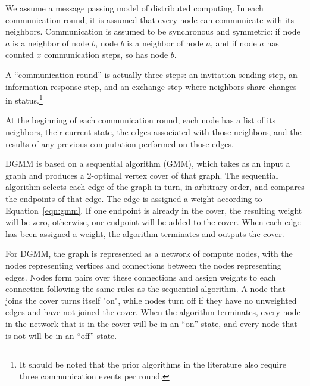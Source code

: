\begin{note}
\label{not:com-model}
We assume a message passing model of distributed computing. In each communication round, it is assumed that every node can communicate with its neighbors. Communication is assumed to be synchronous and symmetric: if node $a$ is a neighbor of node $b$, node $b$ is a neighbor of node $a$, and if node $a$ has counted $x$ communication steps, so has node $b$.

A ``communication round'' is actually three steps: an invitation sending step, an information response step, and an exchange step where neighbors share changes in status.\footnote{It should be noted that the prior algorithms in the literature also require three communication events per round.} 
\end{note}
\begin{note}
\label{not:dgmm-local-info}
At the beginning of each communication round, each node has a list of its neighbors, their current state, the edges associated with those neighbors, and the results of any previous computation performed on those edges.
\end{note}
\begin{note}
\label{not:gmm-dgmm}
DGMM is based on a sequential algorithm (GMM), which takes as an input a graph and produces a 2-optimal vertex cover of that graph. The sequential algorithm selects each edge of the graph in turn, in arbitrary order, and compares the endpoints of that edge. The edge is assigned a weight according to Equation~\ref{eqn:gmm}. If one endpoint is already in the cover, the resulting weight will be zero, otherwise, one endpoint will be added to the cover. When each edge has been assigned a weight, the algorithm terminates and outputs the cover.

For DGMM, the graph is represented as a network of compute nodes, with the nodes representing vertices and connections between the nodes representing edges. Nodes form pairs over these connections and assign weights to each connection following the same rules as the sequential algorithm. A node that joins the cover turns itself "on", while nodes turn off if they have no unweighted edges and have not joined the cover. When the algorithm terminates, every node in the network that is in the cover will be in an ``on'' state, and every node that is not will be in an ``off'' state.
\end{note}
